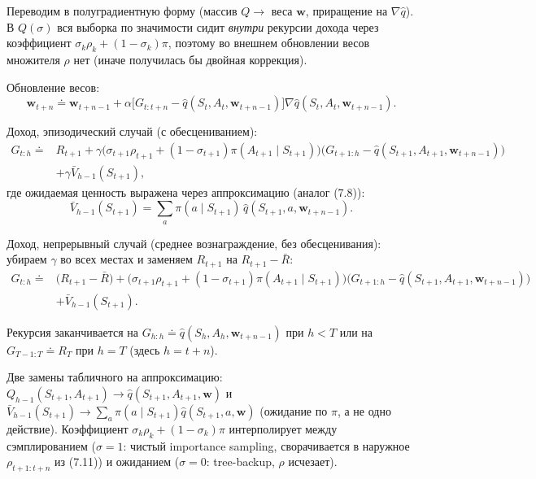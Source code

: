 \begin{solution}
    Переводим в полуградиентную форму (массив $Q\to$ веса $\mathbf w$, приращение
    на $\nabla\hat q$). В $Q(\sigma)$ вся выборка по значимости сидит \emph{внутри}
    рекурсии дохода через коэффициент $\sigma_k\rho_k+(1-\sigma_k)\pi$, поэтому во
    внешнем обновлении весов множителя $\rho$ нет (иначе получилась бы двойная
    коррекция).

    Обновление весов:
    \begin{equation*}
        \mathbf w_{t+n} \doteq \mathbf w_{t+n-1}
        + \alpha\big[G_{t:t+n} - \hat q(S_t,A_t,\mathbf w_{t+n-1})\big]
        \nabla\hat q(S_t,A_t,\mathbf w_{t+n-1}).
    \end{equation*}

    Доход, эпизодический случай (с обесцениванием):
    \begin{equation*}
        \begin{aligned}
        G_{t:h} \doteq{}& R_{t+1}
        + \gamma\big(\sigma_{t+1}\rho_{t+1} + (1-\sigma_{t+1})\pi(A_{t+1}\mid S_{t+1})\big)
          \big(G_{t+1:h} - \hat q(S_{t+1},A_{t+1},\mathbf w_{t+n-1})\big)\\
        &+ \gamma\bar V_{h-1}(S_{t+1}),
        \end{aligned}
    \end{equation*}
    где ожидаемая ценность выражена через аппроксимацию (аналог (7.8)):
    \begin{equation*}
        \bar V_{h-1}(S_{t+1}) = \sum_a \pi(a\mid S_{t+1})\,\hat q(S_{t+1},a,\mathbf w_{t+n-1}).
    \end{equation*}

    Доход, непрерывный случай (среднее вознаграждение, без обесценивания): убираем
    $\gamma$ во всех местах и заменяем $R_{t+1}$ на $R_{t+1}-\bar R$:
    \begin{equation*}
        \begin{aligned}
        G_{t:h} \doteq{}& \big(R_{t+1}-\bar R\big)
        + \big(\sigma_{t+1}\rho_{t+1} + (1-\sigma_{t+1})\pi(A_{t+1}\mid S_{t+1})\big)
          \big(G_{t+1:h} - \hat q(S_{t+1},A_{t+1},\mathbf w_{t+n-1})\big)\\
        &+ \bar V_{h-1}(S_{t+1}).
        \end{aligned}
    \end{equation*}

    Рекурсия заканчивается на $G_{h:h}\doteq \hat q(S_h,A_h,\mathbf w_{t+n-1})$ при
    $h<T$ или на $G_{T-1:T}\doteq R_T$ при $h=T$ (здесь $h=t+n$).

    Две замены табличного на аппроксимацию: $Q_{h-1}(S_{t+1},A_{t+1})\to\hat
    q(S_{t+1},A_{t+1},\mathbf w)$ и $\bar V_{h-1}(S_{t+1})\to\sum_a\pi(a\mid
    S_{t+1})\hat q(S_{t+1},a,\mathbf w)$ (ожидание по $\pi$, а не одно действие).
    Коэффициент $\sigma_k\rho_k+(1-\sigma_k)\pi$ интерполирует между сэмплированием
    ($\sigma=1$: чистый importance sampling, сворачивается в наружное
    $\rho_{t+1:t+n}$ из (7.11)) и ожиданием ($\sigma=0$: tree-backup, $\rho$
    исчезает).
\end{solution}


